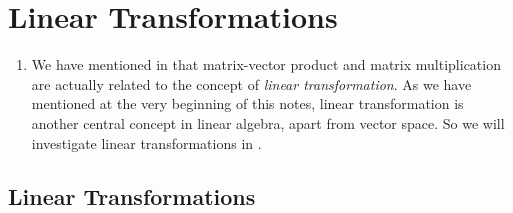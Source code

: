\section{Linear Transformations}
\label{sect:linear-transformations}
\begin{enumerate}
\item We have mentioned in
 that matrix-vector
product and matrix multiplication are actually related to the concept of
\emph{linear transformation}. As we have mentioned at the very beginning of
this notes, linear transformation is another central concept in linear algebra,
apart from vector space. So we will investigate linear transformations in
.
\end{enumerate}
\subsection{Linear Transformations}
